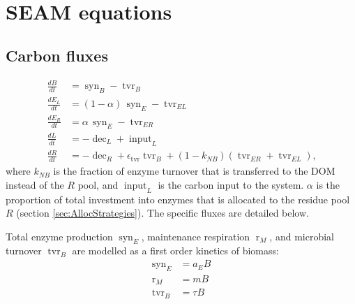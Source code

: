 \section{\\ \\ \hspace*{-7mm}  SEAM equations \label{app:SEAM}}    %

\subsection{Carbon fluxes}
\begin{subequations}
\label{eq:SEAM}
\begin{align}
\frac{dB}{dt} &= \operatorname{syn}_B - \operatorname{tvr}_B \\
\frac{dE_L}{dt} &= (1 - \alpha)  \, \operatorname{syn}_E -\operatorname{tvr}_{EL}\\
\frac{dE_R}{dt} &= \alpha \, \operatorname{syn}_E - \operatorname{tvr}_{ER} \\
\frac{dL}{dt} &=  - \operatorname{dec}_L + \operatorname{input}_L
\\
\frac{dR}{dt} &=  - \operatorname{dec}_R +
\epsilon_{\operatorname{tvr}}  \operatorname{tvr}_B + (1 -k_{NB})
(\operatorname{tvr}_{ER} + \operatorname{tvr}_{EL})
\text{,} 
\end{align}
\end{subequations}
where $k_{NB}$ is the fraction of enzyme turnover that is transferred to the
DOM instead of the $R$ pool, and $\operatorname{input}_L$ is the carbon input
to the system. $\alpha$ is the proportion of total investment into enzymes
that is allocated to the residue pool $R$ (section \ref{sec:AllocStrategies}).
The specific fluxes are detailed below.

Total enzyme production $\operatorname{syn}_E$, maintenance respiration
$\operatorname{r}_{M}$, and microbial turnover $\operatorname{tvr}_B$ are
modelled as a first order kinetics of biomass:
\begin{subequations}
\begin{align}
\label{eq:synE} \operatorname{syn}_E &= a_E B \\
\label{eq:rM} \operatorname{r}_{M} &= m B \\
\label{eq:tvrB} \operatorname{tvr}_B &= \tau B 
\end{align}
\end{subequations}


